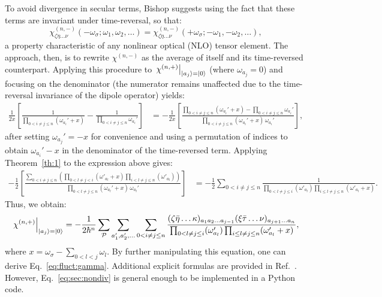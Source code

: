 \documentclass[12pt,a4paper]{article}
\begin{document}
To avoid divergence in secular terms, Bishop \cite{bishopExplicitNondivergentFormulas1994} suggests using the fact that these terms are invariant under time-reversal, so that:
\begin{equation*}
	\chi^{(n,-)}_{\zeta \eta \ldots \nu}(-\omega_\sigma; \omega_1, \omega_2, \ldots) = \chi^{(n,-)}_{\zeta \eta \ldots \nu}(+\omega_\sigma; -\omega_1, -\omega_2, \ldots),
\end{equation*}
a property characteristic of any nonlinear optical (NLO) tensor element. The approach, then, is to rewrite $\chi^{(n,-)}$ as the average of itself and its time-reversed counterpart. Applying this procedure to $\left. \chi^{(n,+)} \right|_{\ket{a_j} = \ket{0}}$ (where $\omega_{a_j} = 0$) and focusing on the denominator (the numerator remains unaffected due to the time-reversal invariance of the dipole operator) yields:
\begin{align*}
	\frac{1}{2x} \left[ \frac{1}{\prod_{0 < i \neq j \leq n} (\omega_{a_i}' + x)} - \frac{1}{\prod_{0 < i \neq j \leq n} \omega_{a_i}'} \right] 
	&= -\frac{1}{2x} \left[ \frac{\prod_{0 < i \neq j \leq n} (\omega_{a_i}' + x) - \prod_{0 < i \neq j \leq n} \omega_{a_i}'}{\prod_{0 < i \neq j \leq n} (\omega_{a_i}' + x) \, \omega_{a_i}'} \right],
\end{align*}
after setting $\omega_{a_j}' = -x$ for convenience and using a permutation of indices to obtain $\omega_{a_i}' - x$ in the denominator of the time-reversed term. Applying Theorem~\ref{th:1} to the expression above gives:
\begin{align*}
	-\frac{1}{2} \left[ \frac{\sum_{0 < i \neq j \leq n} \left( \prod_{0 < l \neq j < i} (\omega'_{a_l} + x) \prod_{i < l \neq j \leq n} (\omega'_{a_l}) \right)}{\prod_{0 < l \neq j \leq n} (\omega_{a_l}' + x) \, \omega_{a_l}'} \right] 
	&= -\frac{1}{2} \sum_{0 < i \neq j \leq n} \frac{1}{\prod_{0 < l \neq j \leq i} (\omega'_{a_l}) \prod_{i \leq l \neq j \leq n} (\omega'_{a_l} + x)}.
\end{align*}
Thus, we obtain:
\begin{equation}
	\left. \chi^{(n,+)} \right|_{\ket{a_j} = \ket{0}} = -\frac{1}{2\hbar^n} \sum_\mathcal{P} \sum_{a_1', a_2', \ldots} \sum_{0 < i \neq j \leq n} \frac{(\zeta \bar{\eta} \ldots \kappa)_{a_1 a_2 \ldots a_{j-1}} (\xi \bar{\tau} \ldots \nu)_{a_{j+1} \ldots a_n}}{\prod_{0 < l \neq j \leq i} (\omega'_{a_l}) \prod_{i \leq l \neq j \leq n} (\omega'_{a_l} + x)}, \label{eq:sec:nondiv}
\end{equation}
where $x = \omega_\sigma - \sum_{0 < l < j} \omega_l$. By further manipulating this equation, one can derive Eq.~\eqref{eq:fluct:gamma}. Additional explicit formulas are provided in Ref.~\cite{bishopExplicitNondivergentFormulas1994}. However, Eq.~\eqref{eq:sec:nondiv} is general enough to be implemented in a Python code.
\end{document}
